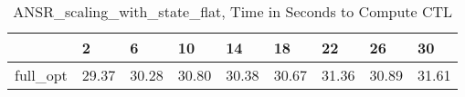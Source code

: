\begin{table}
\caption{ANSR\_scaling\_with\_state\_flat, Time in Seconds to Compute CTL}
\label{ANSR_scaling_with_state_flat_CTL_time}
\begin{tabular}{lllllllll}
\toprule
 & 2 & 6 & 10 & 14 & 18 & 22 & 26 & 30 \\
\midrule
full\_opt & 29.37 & 30.28 & 30.80 & 30.38 & 30.67 & 31.36 & 30.89 & 31.61 \\
\bottomrule
\end{tabular}
\end{table}
